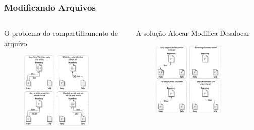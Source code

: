 \documentclass{beamer}
\begin{document}
\begin{frame}
    \frametitle{Modificando Arquivos}
        \begin{columns}
        \begin{column}{.5\textwidth}
            \begin{block}{O problema do compartilhamento de arquivo}
                \begin{figure}
                    \includegraphics[width=0.8\textwidth]{figures/lockmodifyunlock}
                \end{figure}
            \end{block}
        \end{column}
        \begin{column}{.5\textwidth}
            \begin{block}{A solu\c{c}\~ao Alocar-Modifica-Desalocar}
                \begin{figure}
                    \includegraphics[width=0.8\textwidth]{figures/copymodifymerge}

\end{figure}
\end{block}
\end{column}
\end{columns}
\end{frame}
\end{document}
